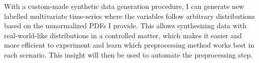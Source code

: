 \documentclass[portrait,final,x11names,a1paper,fontscale=0.4]{baposter}
\begin{document}
\begin{poster}
{\noindent
With a custom-made synthetic data  generation procedure, I can generate new
labelled multivariate time-series where the variables follow arbitrary distributions based on the
unnormalized PDFs I provide. This allows synthesizing data with real-world-like distributions
in a controlled matter, which makes it easier and more efficient to experiment and learn
which preprocessing method works best in each scenario. This insight will then be used to automate the
preprocessing step.




}

\end{poster}
\end{document}

